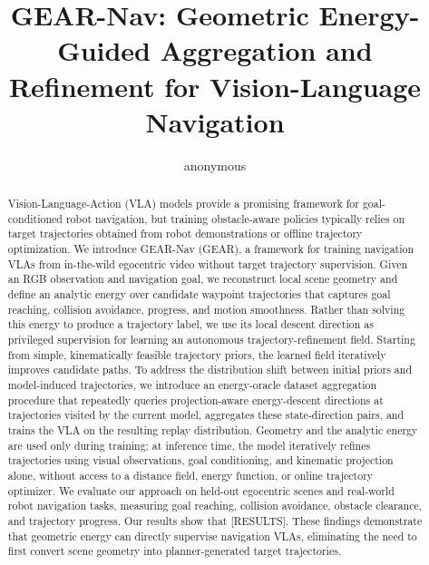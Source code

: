 \documentclass[letterpaper, 10 pt, conference]{ieeeconf}  %
\title{\LARGE \bf
GEAR-Nav: Geometric Energy-Guided Aggregation and Refinement for Vision-Language Navigation
}
\author{anonymous
}
\begin{document}
\maketitle
\thispagestyle{empty}
\pagestyle{empty}


\begin{abstract}

Vision-Language-Action (VLA) models provide a promising framework for goal-conditioned robot navigation, but training obstacle-aware policies typically relies on target trajectories obtained from robot demonstrations or offline trajectory optimization. We introduce GEAR-Nav (GEAR), a framework for training navigation VLAs from in-the-wild egocentric video without target trajectory supervision. Given an RGB observation and navigation goal, we reconstruct local scene geometry and define an analytic energy over candidate waypoint trajectories that captures goal reaching, collision avoidance, progress, and motion smoothness. Rather than solving this energy to produce a trajectory label, we use its local descent direction as privileged supervision for learning an autonomous trajectory-refinement field. Starting from simple, kinematically feasible trajectory priors, the learned field iteratively improves candidate paths. To address the distribution shift between initial priors and model-induced trajectories, we introduce an energy-oracle dataset aggregation procedure that repeatedly queries projection-aware energy-descent directions at trajectories visited by the current model, aggregates these state-direction pairs, and trains the VLA on the resulting replay distribution. Geometry and the analytic energy are used only during training; at inference time, the model iteratively refines trajectories using visual observations, goal conditioning, and kinematic projection alone, without access to a distance field, energy function, or online trajectory optimizer. We evaluate our approach on held-out egocentric scenes and real-world robot navigation tasks, measuring goal reaching, collision avoidance, obstacle clearance, and trajectory progress. Our results show that [RESULTS]. These findings demonstrate that geometric energy can directly supervise navigation VLAs, eliminating the need to first convert scene geometry into planner-generated target trajectories.

\end{abstract}


\end{document}
